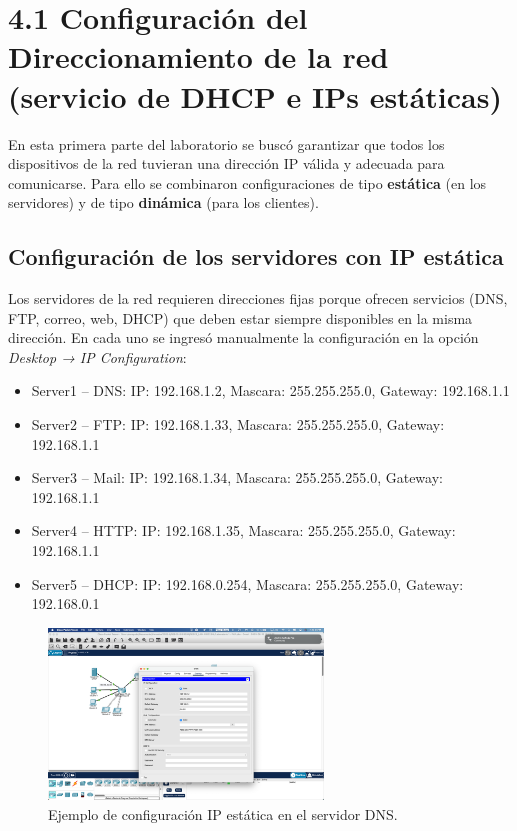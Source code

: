 \documentclass[10pt]{article}
\begin{document}

\section{4.1 Configuración del Direccionamiento de la red (servicio de DHCP e IPs estáticas)}

En esta primera parte del laboratorio se buscó garantizar que todos los dispositivos de la red tuvieran una dirección IP válida y adecuada para comunicarse. Para ello se combinaron configuraciones de tipo \textbf{estática} (en los servidores) y de tipo \textbf{dinámica} (para los clientes).

\subsection{Configuración de los servidores con IP estática}

Los servidores de la red requieren direcciones fijas porque ofrecen servicios (DNS, FTP, correo, web, DHCP) que deben estar siempre disponibles en la misma dirección. En cada uno se ingresó manualmente la configuración en la opción \textit{Desktop → IP Configuration}:

\begin{itemize}
    \item Server1 – DNS: IP: 192.168.1.2, Mascara: 255.255.255.0, Gateway: 192.168.1.1
    \item Server2 – FTP: IP: 192.168.1.33, Mascara: 255.255.255.0, Gateway: 192.168.1.1
    \item Server3 – Mail: IP: 192.168.1.34, Mascara: 255.255.255.0, Gateway: 192.168.1.1
    \item Server4 – HTTP: IP: 192.168.1.35, Mascara: 255.255.255.0, Gateway: 192.168.1.1
    \item Server5 – DHCP: IP: 192.168.0.254, Mascara: 255.255.255.0, Gateway: 192.168.0.1
\end{itemize}

\begin{figure}[H]
    \centering
    \includegraphics[width=0.65\textwidth]{lab-01-screenshots/41-1-DNS-ip-config.png}
    \caption{Ejemplo de configuración IP estática en el servidor DNS.}
\end{figure}
\end{document}
